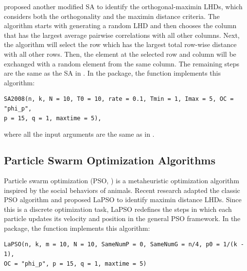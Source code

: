 \cite{joseph2008orthogonal} proposed another modified SA to identify the orthogonal-maximin LHDs, which considers both the orthogonality and the maximin distance criteria. The algorithm starts with generating a random LHD and then chooses the column that has the largest average pairwise correlations with all other columns. %
Next, the algorithm will select the row which has the largest total row-wise distance with all other rows. %
Then, the element at the selected row and column will be exchanged with a random element from the same column. The remaining steps are the same as the SA in \cite{morris1995exploratory}. In the  package, the function  implements this algorithm:
{\small
	\begin{verbatim}
SA2008(n, k, N = 10, T0 = 10, rate = 0.1, Tmin = 1, Imax = 5, OC = "phi_p",
p = 15, q = 1, maxtime = 5),
	\end{verbatim}
}
\noindent where all the input arguments are the same as in .

\subsection{Particle Swarm Optimization Algorithms}

Particle swarm optimization (PSO, \cite{kennedy1995particle}) is a metaheuristic optimization algorithm inspired by the social behaviors of animals. Recent research \citep{chen2013optimizing} adapted the classic PSO algorithm and proposed LaPSO to identify maximin distance LHDs. Since this is a discrete optimization task, LaPSO redefines the steps in which each particle updates its velocity and position in the general PSO framework. In the  package, the function  implements this algorithm:
{\small
	\begin{verbatim}
LaPSO(n, k, m = 10, N = 10, SameNumP = 0, SameNumG = n/4, p0 = 1/(k - 1),
OC = "phi_p", p = 15, q = 1, maxtime = 5)
	\end{verbatim}
}

